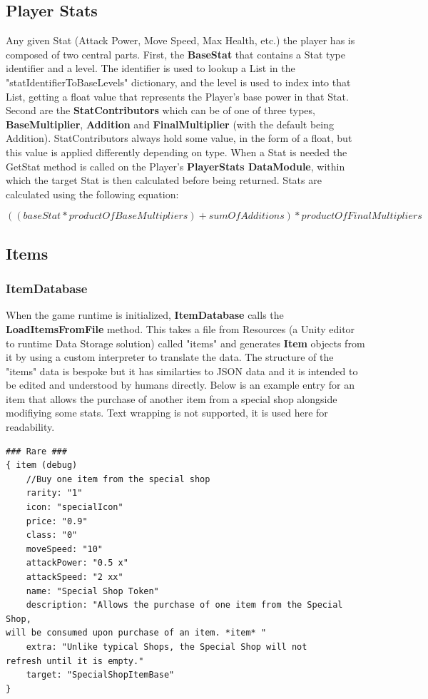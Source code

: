 \documentclass{report}
\begin{document}
\subsection{Player Stats}

Any given Stat (Attack Power, Move Speed, Max Health, etc.) the player has is composed of two central parts. First, the \textbf{BaseStat} that contains a Stat type identifier and a level. The identifier is used to lookup a List in the "statIdentifierToBaseLevels" dictionary, and the level is used to index into that List, getting a float value that represents the Player's base power in that Stat. Second are the \textbf{StatContributors} which can be of one of three types, \textbf{BaseMultiplier}, \textbf{Addition} and \textbf{FinalMultiplier} (with the default being Addition). StatContributors always hold some value, in the form of a float, but this value is applied differently depending on type. When a Stat is needed the GetStat method is called on the Player's \textbf{PlayerStats DataModule}, within which the target Stat is then calculated before being returned. Stats are calculated using the following equation:

\[((baseStat * productOfBaseMultipliers) + sumOfAdditions) * productOfFinalMultipliers \]

\subsection{Items}

\subsubsection{ItemDatabase}

When the game runtime is initialized, \textbf{ItemDatabase} calls the \textbf{LoadItemsFromFile} method. This takes a file from Resources (a Unity editor to runtime Data Storage solution) called "items" and generates \textbf{Item} objects from it by using a custom interpreter to translate the data. The structure of the "items" data is bespoke but it has similarties to JSON data and it is intended to be edited and understood by humans directly. Below is an example entry for an item that allows the purchase of another item from a special shop alongside modifiying some stats. Text wrapping is not supported, it is used here for readability.

\begin{Verbatim}[frame=single]
### Rare ###
{ item (debug)
	//Buy one item from the special shop
	rarity: "1"
	icon: "specialIcon"
	price: "0.9"
	class: "0"
	moveSpeed: "10"
	attackPower: "0.5 x" 
	attackSpeed: "2 xx"
	name: "Special Shop Token"
	description: "Allows the purchase of one item from the Special Shop, 
will be consumed upon purchase of an item. *item* "
	extra: "Unlike typical Shops, the Special Shop will not 
refresh until it is empty."
	target: "SpecialShopItemBase"
}
\end{Verbatim}
\end{document}
